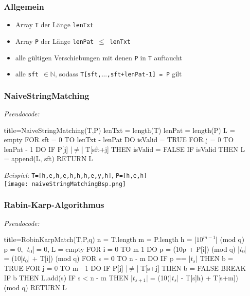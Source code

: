 \subsubsection*{Allgemein}
    \begin{itemize}
        \item {}  Array \texttt{T} der Länge \texttt{lenTxt}
        \item {}  Array \texttt{P} der Länge \texttt{lenPat $\leq$ lenTxt}
        \item {}  alle gültigen Verschiebungen mit denen \texttt{P} in \texttt{T} auftaucht
        \item {} alle \texttt{sft $\in \mathbb{N}$}, sodass \texttt{T[sft,$\dots$,sft+lenPat-1] = P} gilt
    \end{itemize}

\subsubsection*{NaiveStringMatching}
\begin{minipage}{0.4\textwidth}
    \textit{Pseudocode:}
    \begin{ccode}[autogobble,escapeinside=||]{title={NaiveStringMatching(T,P)}}
    lenTxt = length(T)
    lenPat = length(P)
    L = empty
    FOR sft = 0 TO lenTxt - lenPat DO
        isValid = TRUE
        FOR j = 0 TO lenPat - 1 DO
            IF P[j] |$\neq$| T[sft+j] THEN
                isValid = FALSE
        IF isValid THEN
            L = append(L, sft)
    RETURN L
    \end{ccode}
\end{minipage}
\begin{minipage}{0.5\textwidth}
    \textit{Beispiel:} \texttt{T=[h,e,h,e,h,h,h,e,y,h]}, \texttt{P=[h,e,h]} \\
    \texttt{[image: naiveStringMatchingBsp.png]}
\end{minipage}

\subsubsection*{Rabin-Karp-Algorithmus}

\textit{Pseudocode:}
\begin{ccode}[autogobble,escapeinside=||]{title={RobinKarpMatch(T,P,q)}}
n = T.length
m = P.length
h = |$10^{m-1}$| (mod q)
p = 0, |$t_0$| = 0, L = empty
FOR i = 0 TO m-1 DO
    p = (10p + P[i]) (mod q)
    |$t_0$| = (10|$t_0$| + T[i]) (mod q)
FOR s = 0 TO n - m DO
    IF p == |$t_s$| THEN
        b = TRUE
        FOR j = 0 TO m - 1 DO
            IF P[j] |$\neq$| T[s+j] THEN
                b = FALSE
                BREAK
        IF b THEN
            L.add(s)
    IF s < n - m THEN
    |$t_{s+1}$| = (10(|$t_s$| - T[s]h) + T[s+m]) (mod q)
RETURN L
\end{ccode}


